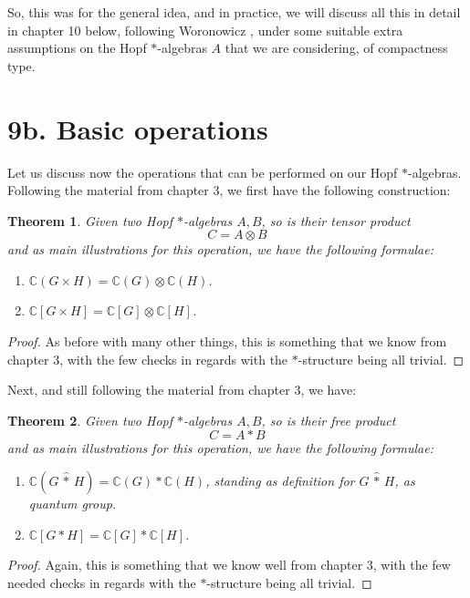 \documentclass[12pt]{amsbook}
\newtheorem{theorem}{Theorem}[chapter]
\begin{document}
So, this was for the general idea, and in practice, we will discuss all this in detail in chapter 10 below, following Woronowicz \cite{wo1}, under some suitable extra assumptions on the Hopf $*$-algebras $A$ that we are considering, of compactness type.

\section*{9b. Basic operations}

Let us discuss now the operations that can be performed on our Hopf $*$-algebras. Following the material from chapter 3, we first have the following construction: 

\begin{theorem}
Given two Hopf $*$-algebras $A,B$, so is their tensor product 
$$C=A\otimes B$$
and as main illustrations for this operation, we have the following formulae:
\begin{enumerate}
\item $\mathbb C(G\times H)=\mathbb C(G)\otimes\mathbb C(H)$.

\item $\mathbb C[G\times H]=\mathbb C[G]\otimes \mathbb C[H]$.
\end{enumerate}
\end{theorem}

\begin{proof}
As before with many other things, this is something that we know from chapter 3, with the few checks in regards with the $*$-structure being all trivial.
\end{proof}

Next, and still following the material from chapter 3, we have:

\begin{theorem}
Given two Hopf $*$-algebras $A,B$, so is their free product 
$$C=A*B$$
and as main illustrations for this operation, we have the following formulae:
\begin{enumerate}
\item $\mathbb C(G\,\hat{*}\,H)=\mathbb C(G)*\mathbb C(H)$, standing as definition for $G\,\hat{*}\,H$, as quantum group.

\item $\mathbb C[G*H]=\mathbb C[G]*\mathbb C[H]$.
\end{enumerate}
\end{theorem}

\begin{proof}
Again, this is something that we know well from chapter 3, with the few needed checks in regards with the $*$-structure being all trivial.
\end{proof}
\end{document}
